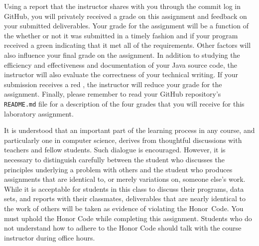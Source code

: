 \documentclass[11pt]{article}
\newcommand{\program}[1]{\lstinline{#1}}
\newcommand{\checkmark}{\ding{51}}
\newcommand{\naughtmark}{\ding{55}}
\begin{document}
Using a report that the instructor shares with you through the commit log in
GitHub, you will privately received a grade on this assignment and feedback on
your submitted deliverables. Your grade for the assignment will be a function of
the whether or not it was submitted in a timely fashion and if your program
received a green \checkmark{} indicating that it met all of the requirements.
Other factors will also influence your final grade on the assignment. In
addition to studying the efficiency and effectiveness and documentation of your
Java source code, the instructor will also evaluate the correctness of your
technical writing. If your submission receives a red \naughtmark{}, the
instructor will reduce your grade for the assignment. Finally, please remember
to read your GitHub repository's \program{README.md} file for a description of
the four grades that you will receive for this laboratory assignment.


It is understood that an important part of the learning process in any course,
and particularly one in computer science, derives from thoughtful discussions
with teachers and fellow students. Such dialogue is encouraged. However, it is
necessary to distinguish carefully between the student who discusses the
principles underlying a problem with others and the student who produces
assignments that are identical to, or merely variations on, someone else's work.
While it is acceptable for students in this class to discuss their programs,
data sets, and reports with their classmates, deliverables that are nearly
identical to the work of others will be taken as evidence of violating the
\mbox{Honor Code}. You must uphold the Honor Code while completing this
assignment. Students who do not understand how to adhere to the Honor Code
should talk with the course instructor during office hours.


\end{document}
